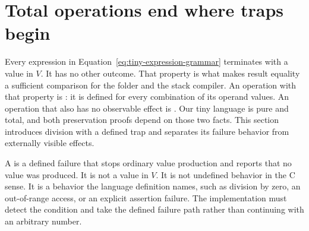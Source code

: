 \section{Total operations end where traps begin}
\label{sec:trap-total-boundary}

Every expression in Equation~\ref{eq:tiny-expression-grammar} terminates with a value in $V$.
It has no other outcome.
That property is what makes result equality a sufficient comparison for the folder and the stack compiler.
An operation with that property is : it is defined for every combination of its operand values.
An operation that also has no observable effect is .
Our tiny language is pure and total, and both preservation proofs depend on those two facts.
This section introduces division with a defined trap and separates its failure behavior from externally visible effects.

A  is a defined failure that stops ordinary value production and reports that no value was produced.
It is not a value in $V$.
It is not undefined behavior in the C sense.
It is a behavior the language definition names, such as division by zero, an out-of-range access, or an explicit assertion failure.
The implementation must detect the condition and take the defined failure path rather than continuing with an arbitrary number.

